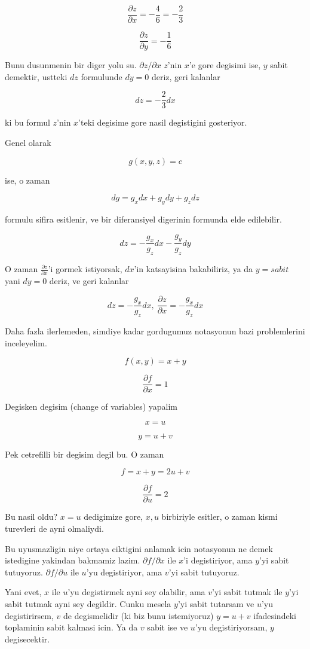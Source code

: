 \documentclass[12pt,fleqn]{article}\usepackage{../common}
\begin{document}
\[ \frac{\partial z}{\partial x} = -\frac{4}{6} = -\frac{2}{3} \]

\[ \frac{\partial z}{\partial y} = -\frac{1}{6} \]

Bunu dusunmenin bir diger yolu su. $\partial z/\partial x$ $z$'nin $x$'e
gore degisimi ise, $y$ sabit demektir, ustteki $dz$ formulunde $dy=0$
deriz, geri kalanlar

\[ dz = -\frac{2}{3}dx \]

ki bu formul $z$'nin $x$'teki degisime gore nasil degistigini gosteriyor. 

Genel olarak 

\[ g(x,y,z) = c \]

ise, o zaman 

\[ dg = g_x dx + g_y dy + g_z dz \]

formulu sifira esitlenir, ve bir diferansiyel digerinin formunda elde
edilebilir. 

\[ dz = -\frac{g_x}{g_z}dx -\frac{g_y}{g_z}dy \]

O zaman $\frac{\partial z}{\partial x}$'i gormek istiyorsak, $dx$'in katsayisina bakabiliriz, ya 
da $y=sabit$ yani $dy=0$ deriz, ve geri kalanlar

\[ dz =  -\frac{g_x}{g_z}dx, \ 
\frac{\partial z}{\partial x} = -\frac{g_x}{g_z}dx
\]

Daha fazla ilerlemeden, simdiye kadar gordugumuz notasyonun bazi
problemlerini inceleyelim. 

\[ f(x,y) = x+y \]

\[ \frac{\partial f}{\partial x} = 1\]

Degisken degisim (change of variables) yapalim

\[ x = u \]

\[ y = u+v \]

Pek cetrefilli bir degisim degil bu. O zaman 

\[ f = x + y = 2u + v \]

\[ \frac{\partial f}{\partial u} = 2\]

Bu nasil oldu? $x=u$ dedigimize gore, $x,u$ birbiriyle esitler, o zaman
kismi turevleri de ayni olmaliydi. 

Bu uyusmazligin niye ortaya ciktigini anlamak icin notasyonun ne demek
istedigine yakindan bakmamiz lazim. $\partial f/\partial x$ ile $x$'i degistiriyor, 
ama $y$'yi sabit tutuyoruz. $\partial f/\partial u$ ile $u$'yu degistiriyor, ama $v$'yi 
sabit tutuyoruz.

Yani evet, $x$ ile $u$'yu degistirmek ayni sey olabilir, ama $v$'yi sabit
tutmak ile $y$'yi sabit tutmak ayni sey degildir. Cunku mesela $y$'yi sabit
tutarsam ve $u$'yu degistirirsem, $v$ de degismelidir (ki biz bunu
istemiyoruz) $y = u+v$ ifadesindeki toplaminin sabit kalmasi icin. Ya da $v$ 
sabit ise ve $u$'yu degistiriyorsam, $y$ degisecektir. 
\end{document}
